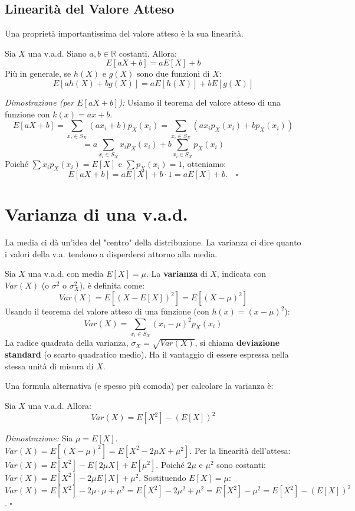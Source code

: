 \subsection{Linearità del Valore Atteso}
Una proprietà importantissima del valore atteso è la sua linearità.
\begin{theorem}
Sia $X$ una v.a.d. Siano $a, b \in \mathbb{R}$ costanti. Allora:
\[ E[aX + b] = aE[X] + b \]
Più in generale, se $h(X)$ e $g(X)$ sono due funzioni di $X$:
\[ E[a h(X) + b g(X)] = a E[h(X)] + b E[g(X)] \]
\end{theorem}
\textit{Dimostrazione (per $E[aX+b]$):}
Usiamo il teorema del valore atteso di una funzione con $k(x) = ax+b$.
\[ E[aX+b] = \sum_{x_i \in S_X} (ax_i+b) p_X(x_i) = \sum_{x_i \in S_X} (ax_i p_X(x_i) + b p_X(x_i)) \]
\[ = a \sum_{x_i \in S_X} x_i p_X(x_i) + b \sum_{x_i \in S_X} p_X(x_i) \]
Poiché $\sum x_i p_X(x_i) = E[X]$ e $\sum p_X(x_i) = 1$, otteniamo:
\[ E[aX+b] = aE[X] + b \cdot 1 = aE[X] + b. \quad \square \]

\section{Varianza di una v.a.d.}
La media ci dà un'idea del "centro" della distribuzione. La varianza ci dice quanto i valori della v.a. tendono a disperdersi attorno alla media.

\begin{definition}
Sia $X$ una v.a.d. con media $E[X]=\mu$. La \textbf{varianza} di $X$, indicata con $Var(X)$ (o $\sigma^2$ o $\sigma_X^2$), è definita come:
\[ Var(X) = E[(X - E[X])^2] = E[(X-\mu)^2] \]
Usando il teorema del valore atteso di una funzione (con $h(x)=(x-\mu)^2$):
\[ Var(X) = \sum_{x_i \in S_X} (x_i - \mu)^2 p_X(x_i) \]
La radice quadrata della varianza, $\sigma_X = \sqrt{Var(X)}$, si chiama \textbf{deviazione standard} (o scarto quadratico medio). Ha il vantaggio di essere espressa nella stessa unità di misura di $X$.
\end{definition}

Una formula alternativa (e spesso più comoda) per calcolare la varianza è:
\begin{theorem}
Sia $X$ una v.a.d. Allora:
\[ Var(X) = E[X^2] - (E[X])^2 \]
\end{theorem}
\textit{Dimostrazione:}
Sia $\mu = E[X]$.
$Var(X) = E[(X-\mu)^2] = E[X^2 - 2\mu X + \mu^2]$.
Per la linearità dell'attesa:
$Var(X) = E[X^2] - E[2\mu X] + E[\mu^2]$.
Poiché $2\mu$ e $\mu^2$ sono costanti:
$Var(X) = E[X^2] - 2\mu E[X] + \mu^2$.
Sostituendo $E[X]=\mu$:
$Var(X) = E[X^2] - 2\mu \cdot \mu + \mu^2 = E[X^2] - 2\mu^2 + \mu^2 = E[X^2] - \mu^2 = E[X^2] - (E[X])^2$. $\square$

